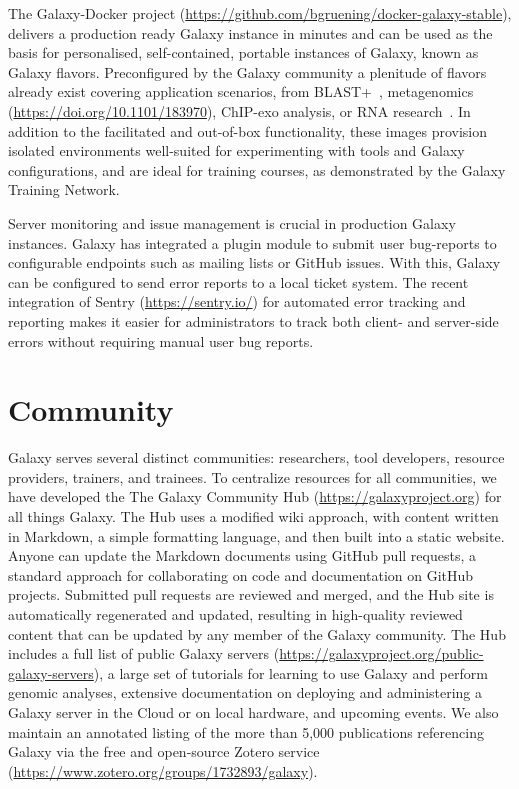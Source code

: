 The Galaxy-Docker project (\url{https://github.com/bgruening/docker-galaxy-stable}), delivers a production ready Galaxy instance in minutes and can be used as the basis for personalised, self-contained, portable instances of Galaxy, known as Galaxy flavors. Preconfigured by the Galaxy community a plenitude of flavors already exist covering application scenarios, from BLAST+~\cite{cock2015ncbi,camacho2009blast+}, metagenomics (\url{https://doi.org/10.1101/183970}), ChIP-exo analysis, or RNA research~\cite{gruning2017rna}. In addition to the facilitated and out-of-box functionality, these images provision isolated environments well-suited for experimenting with tools and Galaxy configurations, and are ideal for training courses, as demonstrated by the Galaxy Training Network.

Server monitoring and issue management is crucial in production Galaxy instances. Galaxy has integrated a plugin module to submit user bug-reports to configurable endpoints such as mailing lists or GitHub issues. With this, Galaxy can be configured to send error reports to a local ticket system. The recent integration of Sentry (\url{https://sentry.io/}) for automated error tracking and reporting makes it easier for administrators to track both client- and server-side errors without requiring manual user bug reports.

\section*{Community}
Galaxy serves several distinct communities: researchers, tool developers, resource providers, trainers, and trainees. To centralize resources for all communities, we have developed the The Galaxy Community Hub (\url{https://galaxyproject.org}) for all things Galaxy. The Hub uses a modified wiki approach, with content written in Markdown, a simple formatting language, and then built into a static website. Anyone can update the Markdown documents using GitHub pull requests, a standard approach for collaborating on code and documentation on GitHub projects. Submitted pull requests are reviewed and merged, and the Hub site is automatically regenerated and updated, resulting in high-quality reviewed content that can be updated by any member of the Galaxy community. The Hub includes a full list of public Galaxy servers (\url{https://galaxyproject.org/public-galaxy-servers}), a large set of tutorials for learning to use Galaxy and perform genomic analyses, extensive documentation on deploying and administering a Galaxy server in the Cloud or on local hardware, and upcoming events. We also maintain an annotated listing of the more than 5,000 publications referencing Galaxy via the free and open-source Zotero service (\url{https://www.zotero.org/groups/1732893/galaxy}).


